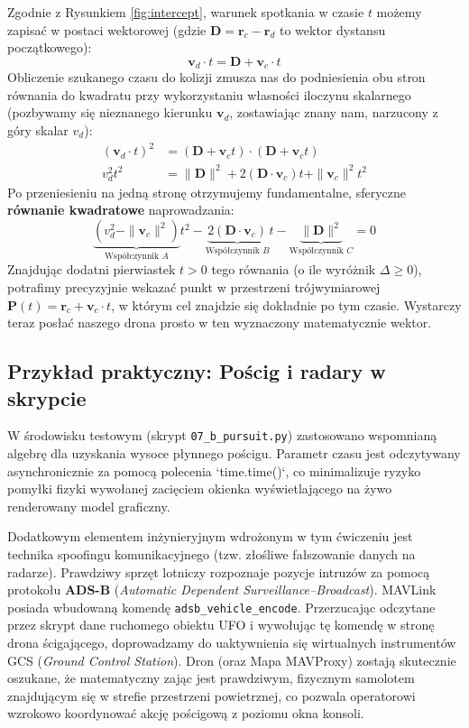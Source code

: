 Zgodnie z Rysunkiem \ref{fig:intercept}, warunek spotkania w czasie $t$ możemy zapisać w postaci wektorowej (gdzie $\mathbf{D} = \mathbf{r}_c - \mathbf{r}_d$ to wektor dystansu początkowego):
\begin{equation}
    \mathbf{v}_d \cdot t = \mathbf{D} + \mathbf{v}_c \cdot t
\end{equation}
Obliczenie szukanego czasu do kolizji zmusza nas do podniesienia obu stron równania do kwadratu przy wykorzystaniu własności iloczynu skalarnego (pozbywamy się nieznanego kierunku $\mathbf{v}_d$, zostawiając znany nam, narzucony z góry skalar $v_d$):
\begin{align}
    (\mathbf{v}_d \cdot t)^2 &= (\mathbf{D} + \mathbf{v}_c t) \cdot (\mathbf{D} + \mathbf{v}_c t) \\
    v_d^2 t^2 &= \|\mathbf{D}\|^2 + 2 (\mathbf{D} \cdot \mathbf{v}_c) t + \|\mathbf{v}_c\|^2 t^2
\end{align}
Po przeniesieniu na jedną stronę otrzymujemy fundamentalne, sferyczne \textbf{równanie kwadratowe} naprowadzania:
\begin{equation}
    \underbrace{(v_d^2 - \|\mathbf{v}_c\|^2)}_{\text{Współczynnik } A} t^2 
    - \underbrace{2 (\mathbf{D} \cdot \mathbf{v}_c)}_{\text{Współczynnik } B} t 
    - \underbrace{\|\mathbf{D}\|^2}_{\text{Współczynnik } C} = 0
\end{equation}
Znajdując dodatni pierwiastek $t > 0$ tego równania (o ile wyróżnik $\Delta \ge 0$), potrafimy precyzyjnie wskazać punkt w przestrzeni trójwymiarowej $\mathbf{P}(t) = \mathbf{r}_c + \mathbf{v}_c \cdot t$, w którym cel znajdzie się dokładnie po tym czasie. Wystarczy teraz posłać naszego drona prosto w ten wyznaczony matematycznie wektor.

\subsection{Przykład praktyczny: Pościg i radary w skrypcie}
W środowisku testowym (skrypt \texttt{07\_b\_pursuit.py}) zastosowano wspomnianą algebrę dla uzyskania wysoce płynnego pościgu. Parametr czasu jest odczytywany asynchronicznie za pomocą polecenia `time.time()`, co minimalizuje ryzyko pomyłki fizyki wywołanej zacięciem okienka wyświetlającego na żywo renderowany model graficzny.

Dodatkowym elementem inżynieryjnym wdrożonym w tym ćwiczeniu jest technika spoofingu komunikacyjnego (tzw. złośliwe fałszowanie danych na radarze). Prawdziwy sprzęt lotniczy rozpoznaje pozycje intruzów za pomocą protokołu \textbf{ADS-B} (\textit{Automatic Dependent Surveillance–Broadcast}). MAVLink posiada wbudowaną komendę \texttt{adsb\_vehicle\_encode}. Przerzucając odczytane przez skrypt dane ruchomego obiektu UFO i wywołując tę komendę w stronę drona ścigającego, doprowadzamy do uaktywnienia się wirtualnych instrumentów GCS (\textit{Ground Control Station}). Dron (oraz Mapa MAVProxy) zostają skutecznie oszukane, że matematyczny zając jest prawdziwym, fizycznym samolotem znajdującym się w strefie przestrzeni powietrznej, co pozwala operatorowi wzrokowo koordynować akcję pościgową z poziomu okna konsoli.